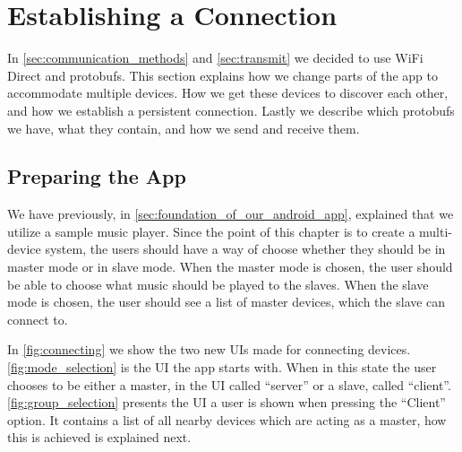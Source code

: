 \section{Establishing a Connection}\label{sec:establishing_a_connection}
In \cref{sec:communication_methods} and \cref{sec:transmit} we decided to use WiFi Direct and protobufs.
This section explains how we change parts of the app to accommodate multiple devices.
How we get these devices to discover each other, and how we establish a persistent connection.
Lastly we describe which protobufs we have, what they contain, and how we send and receive them.

\subsection{Preparing the App}
We have previously, in \cref{sec:foundation_of_our_android_app}, explained that we utilize a sample music player.
Since the point of this chapter is to create a multi-device system, the users should have a way of choose whether they should be in master mode or in slave mode.
When the master mode is chosen, the user should be able to choose what music should be played to the slaves.
When the slave mode is chosen, the user should see a list of master devices, which the slave can connect to.

In \cref{fig:connecting} we show the two new UIs made for connecting devices.
\cref{fig:mode_selection} is the UI the app starts with.
When in this state the user chooses to be either a master, in the UI called ``server'' or a slave, called ``client''.
\cref{fig:group_selection} presents the UI a user is shown when pressing the ``Client'' option.
It contains a list of all nearby devices which are acting as a master, how this is achieved is explained next.

